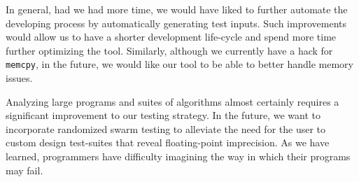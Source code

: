 In general, had we had more time, we would have liked to further automate the developing process by automatically generating test inputs. Such improvements would allow us to have a shorter development life-cycle and spend more time further optimizing the tool. Similarly, although we currently have a hack for \texttt{memcpy}, in the future, we would like our tool to be able to better handle memory issues.

Analyzing large programs and suites of algorithms almost certainly requires a significant improvement to our testing strategy. In the future, we want to incorporate randomized swarm testing to alleviate the need for the user to custom design test-suites that reveal floating-point imprecision. As we have learned, programmers have difficulty imagining the way in which their programs may fail.
